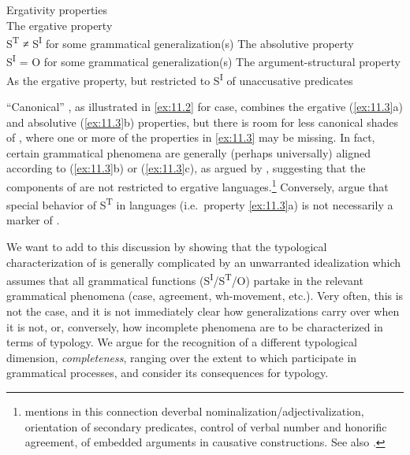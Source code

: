 \documentclass[output=paper]{langsci/langscibook}
\begin{document}
\ea%
    \label{ex:11.3}Ergativity properties \citep{Deal2015}\\
	\ea The ergative property\\
        S\textsuperscript{T} ≠ S\textsuperscript{I} for some grammatical
        generalization(s)
	\ex The absolutive property\\
        S\textsuperscript{I} = O for some grammatical generalization(s)
	\ex The argument-structural property\\
        As the ergative property, but restricted to S\textsuperscript{I} of
        unaccusative predicates
	\z
\z

\enquote{Canonical} , as illustrated in \eqref{ex:11.2} for
 case, combines the ergative (\ref{ex:11.3}a) and absolutive (\ref{ex:11.3}b)
properties, but there is room for less canonical shades of , where
one or more of the properties in \eqref{ex:11.3} may be missing. In fact,
certain grammatical phenomena are generally (perhaps universally) aligned
according to (\ref{ex:11.3}b) or (\ref{ex:11.3}c), as argued by \textcite{Queixalos2013}, suggesting
that the components of  are not restricted to ergative
languages.\footnote{\textcite{Queixalos2013} mentions in this connection
    deverbal nominalization/adjectivalization, orientation of secondary
    predicates, control of verbal number and honorific agreement,  of
embedded arguments in causative constructions. See also
\citet{Moravcsik1978,Plank1979}.\label{fn:3}} Conversely,
\citet{VerbekeWillems2012} argue that special behavior of S\textsuperscript{T}
in  languages (i.e.\ property \ref{ex:11.3}a) is not
necessarily a marker of .

We want to add to this discussion by showing that the typological
characterization of  is generally complicated by an unwarranted
idealization which assumes that all grammatical functions
(S\textsuperscript{I}/S\textsuperscript{T}/O) partake in the relevant
grammatical phenomena (case, agreement, wh-movement, etc.). Very often, this is
not the case, and it is not immediately clear how  generalizations
carry over when it is not, or, conversely, how incomplete phenomena are to be
characterized in terms of  typology. We argue for the recognition of a
different typological dimension, \emph{completeness}, ranging over the extent
to which  participate in grammatical processes, and
consider its consequences for  typology.
\end{document}
